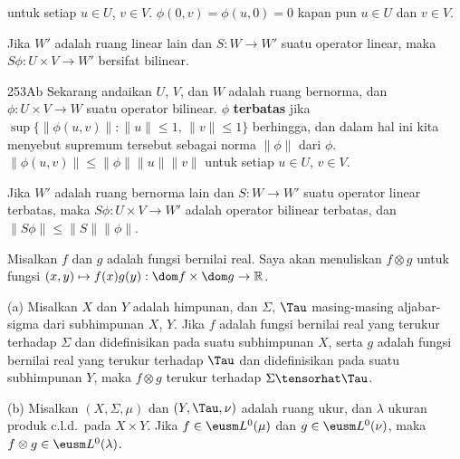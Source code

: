 \noindent untuk setiap $u\in U$, $v\in V$.  $\phi(0,v)=\phi(u,0)=0$ kapan pun $u\in U$ dan
$v\in V$.

Jika $W'$ adalah ruang linear lain dan
$S:W\to W'$ suatu operator linear, maka $S\phi:U\times V\to W'$ bersifat
bilinear.

\spheader 253Ab Sekarang andaikan $U$, $V$, dan $W$ adalah
ruang bernorma, dan $\phi:U\times V\to W$ suatu operator bilinear.
 $\phi$ {\bf terbatas} jika
$\sup\{\|\phi(u,v)\|:\|u\|\le 1,\,\|v\|\le 1\}$ berhingga, dan dalam hal ini
kita menyebut supremum tersebut sebagai
norma $\|\phi\|$ dari $\phi$. 
$\|\phi(u,v)\|\le\|\phi\|\|u\|\|v\|$ untuk setiap $u\in U$, $v\in
V$.

Jika $W'$ adalah ruang bernorma lain dan $S:W\to W'$ suatu operator linear
terbatas, maka $S\phi:U\times V\to W'$ adalah operator bilinear terbatas,
dan $\|S\phi\|\le\|S\|\|\phi\|$.

 Misalkan $f$ dan $g$ adalah
fungsi bernilai real. Saya akan menuliskan $f\otimes g$ untuk fungsi
$(x,y)\mapsto f(x)g(y):\dom f\times\dom g\to\Bbb R$.

(a) Misalkan $X$ dan $Y$ adalah himpunan, dan $\Sigma$, $\Tau$ masing-masing
aljabar-sigma dari subhimpunan $X$, $Y$. Jika $f$ adalah fungsi bernilai real
yang terukur terhadap $\Sigma$ dan didefinisikan pada suatu subhimpunan $X$,
serta $g$ adalah fungsi bernilai real yang terukur terhadap $\Tau$ dan
didefinisikan pada suatu subhimpunan $Y$, maka $f\otimes g$ terukur terhadap $\Sigma\tensorhat\Tau$.

(b) Misalkan $(X,\Sigma,\mu)$ dan $(Y,\Tau,\nu)$ adalah ruang ukur, dan
$\lambda$ ukuran produk c.l.d.\ pada $X\times Y$. Jika
$f\in\eusm L^0(\mu)$ dan $g\in\eusm L^0(\nu)$, maka
$f\otimes g\in\eusm L^0(\lambda)$.


